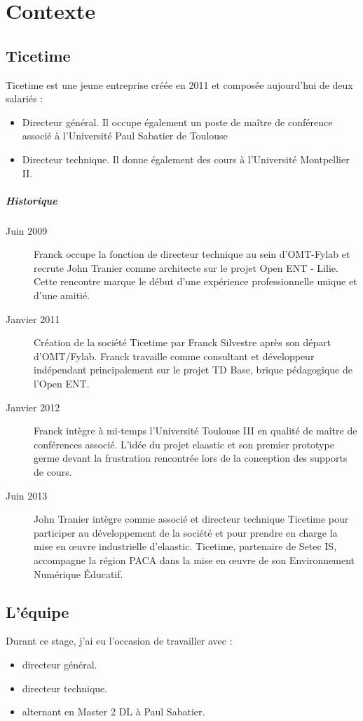 \chapter{Contexte}
\section{Ticetime}
\newcommand{\ticetime}[2]{\item[{\it #1}] #2}
Ticetime est une jeune entreprise créée en 2011 et composée aujourd'hui de deux salariés :
\begin{itemize}
  \ticetime{Franck Silvestre}{Directeur général. Il occupe également
  un poste de maître de conférence associé à l'Université Paul Sabatier de
  Toulouse}
  \ticetime{John Tranier}{Directeur technique. Il donne également des cours à
  l'Université Montpellier II.}
\end{itemize}

\paragraph{Historique}
\begin{description}
  \item[Juin 2009] Franck occupe la fonction de directeur technique au sein
	d'OMT-Fylab et recrute John Tranier comme architecte sur le projet Open ENT
	- Lilie. Cette rencontre marque le début d'une expérience professionnelle
	unique et d'une amitié.
  \item[Janvier 2011] Création de la société Ticetime par Franck Silvestre après
	son départ d'OMT/Fylab. Franck travaille comme consultant et développeur
	indépendant principalement sur le projet TD Base, brique pédagogique de
	l'Open ENT.
  \item[Janvier 2012] Franck intègre à mi-temps l'Université Toulouse III en
	qualité de maître de conférences associé. L'idée du projet elaastic et son
	premier prototype germe devant la frustration rencontrée lors de la
	conception des supports de cours.
  \item[Juin 2013] John Tranier intègre comme associé et directeur technique
	Ticetime pour participer au développement de la société et pour prendre en
	charge la mise en \oe uvre industrielle d'elaastic. Ticetime, partenaire de
	Setec IS, accompagne la région PACA dans la mise en \oe uvre de son
	Environnement Numérique Éducatif.
\end{description}
\section{L'équipe}
Durant ce stage, j'ai eu l'occasion de travailler avec :\\
\begin{itemize}
  \ticetime{Franck Silvestre}{directeur général.}
  \ticetime{John Tranier}{directeur technique.}
  \ticetime{Vincent Tertre}{alternant en Master 2 DL à Paul Sabatier.}
\end{itemize}
